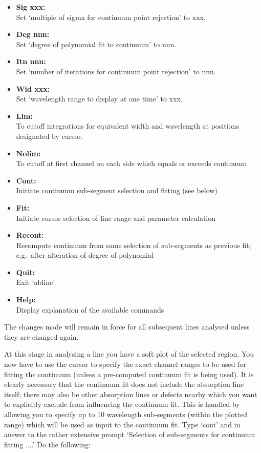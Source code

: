 \begin{itemize}
\item{\bf Sig xxx:}\ \\
   Set `multiple of sigma for continuum point rejection' to xxx.
\item{\bf Deg nnn:}\ \\
   Set `degree of polynomial fit to continuum' to nnn.
\item{\bf Itn nnn:}\ \\
   Set `number of iterations for continuum point rejection' to nnn.
\item{\bf Wid xxx:}\ \\
   Set `wavelength range to display at one time' to xxx.
\item{\bf Lim:}\ \\
   To cutoff integrations for equivalent width and wavelength at
   positions designated by cursor.
\item{\bf Nolim:}\ \\
   To cutoff at first channel on each side which equals or exceeds
   continuum
\item{\bf Cont:}\ \\
   Initiate continuum sub-segment selection and fitting (see below)
\item{\bf Fit:}\ \\
   Initiate cursor selection of line range and parameter calculation
\item{\bf Recont:}\ \\
   Recompute continuum from same selection of sub-segments as previous
   fit; e.g.\ after alteration of degree of polynomial
\item{\bf Quit:}\ \\
   Exit `abline'
\item{\bf Help:}\ \\
   Display explanation of the available commands
\end{itemize}

   The changes made will remain in force for all subsequent lines
   analysed unless they are changed again.

   At this stage in analysing a line you have a soft plot of the
   selected region. You now have to use the cursor to specify the exact
   channel ranges to be used for fitting the continuum (unless a
   pre-computed continuum fit is being used). It is clearly necessary
   that the continuum fit does not include the absorption line itself;
   there may also be other absorption lines or defects nearby which you
   want to explicitly exclude from influencing the continuum fit. This
   is handled by allowing you to specify up to 10 wavelength sub-segments
   (within the plotted range) which will be used as input to the
   continuum fit. Type `cont' and in answer to the rather extensive
   prompt `Selection of sub-segments for continuum fitting ....' Do the
   following:

